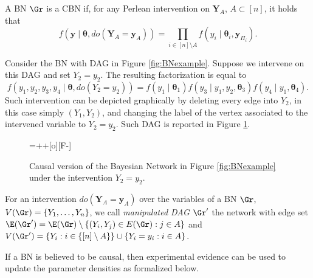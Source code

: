 \begin{definition}
\label{def:cbn}
A \gls{BN} $\Gr$ is a \gls{CBN} if, for any Perlean intervention on $\bm{Y}_A$, $A\subset[n]$, it holds that 
\begin{equation*}
f\left(\bm{y}\;|\;\bm{\theta},do(\bm{Y}_A=\bm{y}_A)\right)=\prod_{i\in[n]\setminus A}f\left(y_i\;|\;\bm{\theta}_i,\bm{y}_{\Pi_i}\right).
\end{equation*} 
\end{definition} 

\begin{example}
Consider the \gls{BN} with \gls{DAG} in Figure \ref{fig:BNexample}. Suppose we intervene on this \gls{DAG} and set $Y_2=y_2$. The resulting factorization is equal to
\begin{equation*}
f\left(y_1,y_2,y_3,y_4\;|\;\bm{\theta},do(Y_2=y_2)\right)=f(y_1\;|\;\bm{\theta}_1)f(y_3\;|\;y_1,y_2,\bm{\theta}_3)f(y_4\;|\;y_1,\bm{\theta}_4).
\end{equation*}
Such intervention can be depicted graphically by deleting every edge into $Y_2$, in this case simply $(Y_1,Y_2)$, and changing the label of the vertex associated to the intervened variable to $Y_2=y_2$. Such \gls{DAG} is reported in Figure \ref{figure:causalBN}.
\end{example}

\begin{figure}
\vspace{0.3cm}
\entrymodifiers={++[o][F-]}
\centerline{
}
\vspace{0.3cm}
\caption{
Causal version of the Bayesian Network in Figure \ref{fig:BNexample} under the intervention $Y_2=y_2$. \label{figure:causalBN}}
\end{figure}

\begin{definition}
For an intervention $do(\bm{Y}_A=\bm{y}_A)$ over the variables of a \gls{BN} $\Gr$, $V(\Gr)=\{Y_1,\dots,Y_n\}$, we call \emph{manipulated \gls{DAG}} $\Gr'$ the network with edge set $\E(\Gr')=\E(\Gr)\setminus\{(Y_i,Y_j)\in E(\Gr): j\in A\}$ and $V(\Gr')=\{Y_i: i\in \{[n]\setminus A\}\}\cup \{Y_i=y_i: i\in A\}$.
\end{definition}

If a \gls{BN} is believed to be causal, then experimental evidence can be used to update the parameter densities as formalized below.

